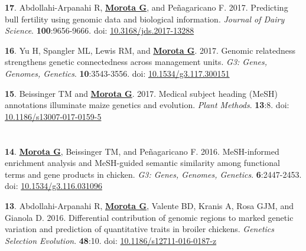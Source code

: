 \documentclass[margin,line,10pt]{res}
\newenvironment{list1}{
  \begin{list}{\ding{113}}{%
      \setlength{\itemsep}{0in}
      \setlength{\parsep}{0in} \setlength{\parskip}{0in}
      \setlength{\topsep}{0in} \setlength{\partopsep}{0in} 
      \setlength{\leftmargin}{0.17in}}}{\end{list}}
\begin{document}
\begin{resume}
\begin{list1}
  \vspace{0.5cm}
    
\item  [{\bf 17}.] Abdollahi-Arpanahi R, \textbf{\underline{Morota G}}, and  Pe\~{n}agaricano F. 2017. Predicting bull fertility using genomic data and biological information. \emph{Journal of Dairy Science}. \textbf{100}:9656-9666. doi: \textcolor{blue}{\href{https://doi.org/10.3168/jds.2017-13288}{10.3168/jds.2017-13288}}

    \vspace{0.5cm}
    
  \item  [{\bf 16}.]  Yu H, Spangler ML, Lewis RM, and \textbf{\underline{Morota G}}. 2017. Genomic relatedness strengthens genetic connectedness across management units. \emph{G3: Genes, Genomes, Genetics}. \textbf{10}:3543-3556. doi: \textcolor{blue}{\href{https://doi.org/10.1534/g3.117.300151}{10.1534/g3.117.300151}}

    \vspace{0.5cm}
    
\item [{\bf 15}.] Beissinger TM and \textbf{\underline{Morota G}}. 2017. Medical subject heading (MeSH) annotations illuminate maize genetics and evolution. \emph{Plant Methods}. \textbf{13}:8. doi: \textcolor{blue}{\href{http://dx.doi.org/10.1186/s13007-017-0159-5}{10.1186/s13007-017-0159-5}}

\end{list1}



\section{}

\begin{list1}

  \item [{\bf 14}.]  \textbf{\underline{Morota G}}, Beissinger TM, and Pe\~{n}agaricano F. 2016. MeSH-informed enrichment analysis and MeSH-guided semantic similarity among functional terms and gene products in chicken. \emph{G3: Genes, Genomes, Genetics}. \textbf{6}:2447-2453. doi: \textcolor{blue}{\href{http://dx.doi.org/10.1534/g3.116.031096}{10.1534/g3.116.031096}}  

\vspace{0.5cm}

  \item [{\bf 13}.] Abdollahi-Arpanahi R, {\bf \underline{Morota G}}, Valente BD, Kranis A, Rosa GJM, and Gianola D. 
  2016. Differential contribution of genomic regions to marked genetic variation and prediction of quantitative traits in broiler chickens. \emph{Genetics Selection Evolution}. \textbf{48}:10. doi: \textcolor{blue}{\href{http://dx.doi.org/10.1186/s12711-016-0187-z}{10.1186/s12711-016-0187-z}}


\end{list1}
\end{resume}
\end{document}
